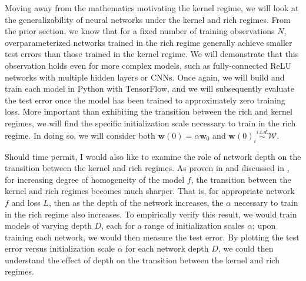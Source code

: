 \documentclass{article}
\begin{document}
Moving away from the mathematics motivating the kernel regime, we will look at the generalizability of neural networks under the kernel and rich regimes. From the prior section, we know that for a fixed number of training observations $N$, overparameterized networks trained in the rich regime generally achieve smaller test errors than those trained in the kernel regime. We will demonstrate that this observation holds even for more complex models, such as fully-connected ReLU networks with multiple hidden layers or CNNs. Once again, we will build and train each model in Python with TensorFlow, and we will subsequently evaluate the test error once the model has been trained to approximately zero training loss. More important than exhibiting the transition between the rich and kernel regimes, we will find the specific initialization scale necessary to train in the rich regime. In doing so, we will consider both $\boldsymbol{w}(0) = \alpha \boldsymbol{w}_0$ and $\boldsymbol{w}(0)_i \overset{i.i.d.}{\sim} \mathcal{W}$.

Should time permit, I would also like to examine the role of network depth on the transition between the kernel and rich regimes. As proven in \cite{arora2019implicit} and discussed in \cite{woodworth2020kernel}, for increasing degree of homogeneity of the model $f$, the transition between the kernel and rich regimes becomes much sharper. That is, for appropriate network $f$ and loss $L$, then as the depth of the network increases, the $\alpha$ necessary to train in the rich regime also increases. To empirically verify this result, we would train models of varying depth $D$, each for a range of initialization scales $\alpha$; upon training each network, we would then measure the test error. By plotting the test error versus initialization scale $\alpha$ for each network depth $D$, we could then understand the effect of depth on the transition between the kernel and rich regimes. 
\subsection{}
\end{document}
